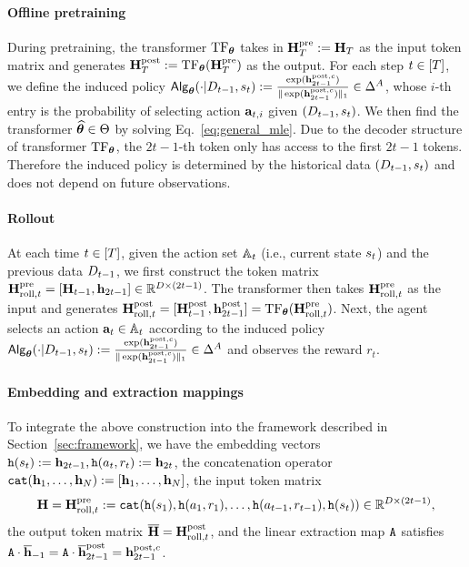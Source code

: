 \paragraph{Offline pretraining} 
During pretraining, the transformer ${\rm TF}_{{\boldsymbol \theta}}$ takes in   ${\mathbf H}_{T}^{\mathrm{pre}}:={\mathbf H}_{T}$ as the input token matrix and generates ${\mathbf H}_{T}^{\mathrm{post}}:={\rm TF}_{{\boldsymbol \theta}}({\mathbf H}_{T}^{\mathrm{pre}})$ as the output. For each step $t\in[{T}]$, we define the  induced policy  ${\mathsf{Alg}}_{{\boldsymbol \theta}}(\cdot|{D}_{t-1},{s}_t):=\frac{\exp({\mathbf h}^{{\mathrm{post}},{c}}_{2t-1})}{\|\exp({\mathbf h}^{{\mathrm{post}},{c}}_{2t-1})\|_1}\in\Delta^A$, whose $i$-th entry is the probability of selecting action ${\mathbf a}_{t,i}$ given $({D}_{t-1},{s}_t)$. We then find the transformer ${\widehat{{\boldsymbol \theta}}}\in{\Theta}$ by solving Eq.~\eqref{eq:general_mle}. 
Due to the decoder structure of transformer ${\rm TF}_{{\boldsymbol \theta}}$, the $2t-1$-th token only has access to the first $2t-1$ tokens. Therefore the induced policy is  determined by the historical data $({D}_{t-1},{s}_t)$ and does not depend on future observations. 
\paragraph{Rollout}
At each time $t\in[{T}]$, given the action set ${\mathbb{A}}_t$ (i.e., current state ${s}_t$) and the previous data ${D}_{t-1}$, we first construct the token matrix ${\mathbf H}^{{\mathrm{pre}}}_{{\mathrm{roll}},t}=[{\mathbf H}_{t-1},{\mathbf h}_{2t-1}]\in\mathbb{R}^{D\times (2t-1)}$.   The transformer then takes ${\mathbf H}^{{\mathrm{pre}}}_{{\mathrm{roll}},t}$ as the input  and generates ${\mathbf H}^{{\mathrm{post}}}_{{\mathrm{roll}},t}=[{\mathbf H}^{{\mathrm{post}}}_{t-1},{\mathbf h}^{{\mathrm{post}}}_{2t-1}]={\rm TF}_{{\boldsymbol \theta}}({\mathbf H}^{{\mathrm{pre}}}_{{\mathrm{roll}},t})$. Next,  the agent selects an action ${\mathbf a}_t\in{\mathbb{A}}_t$ according to the induced  policy ${\mathsf{Alg}}_{{\boldsymbol \theta}}(\cdot|{D}_{t-1},{s}_t):=\frac{\exp({\mathbf h}^{{\mathrm{post}},{c}}_{2t-1})}{\|\exp({\mathbf h}^{{\mathrm{post}},{c}}_{2t-1})\|_1}\in\Delta^A$ and observes the reward $r_t$.

\paragraph{Embedding and extraction mappings}
To integrate the above construction into the  framework described in Section~\ref{sec:framework},  we have the embedding vectors ${\tt h}({s}_t):={\mathbf h}_{2t-1},{\tt h}({a}_t,{r}_t):={\mathbf h}_{2t}$,  the concatenation operator ${\tt cat}({\mathbf h}_1, \ldots, {\mathbf h}_N): = [{\mathbf h}_1, \ldots, {\mathbf h}_N]$, the input token matrix  $${\mathbf H}={\mathbf H}^{\mathrm{pre}}_{{\mathrm{roll}},t}: = {\tt cat}({\tt h}({s}_1), {\tt h}({a}_1, {r}_1), \ldots, {\tt h}({a}_{t-1}, {r}_{t-1}), {\tt h}({s}_t)) \in \mathbb{R}^{D \times (2t-1)},$$ the output token matrix $\overline{{\mathbf H}}={\mathbf H}^{\mathrm{post}}_{{\mathrm{roll}},t}$, and the linear extraction map ${\tt A}$  satisfies ${\tt A}\cdot\overline{{\mathbf h}}_{-1}={\tt A}\cdot\overline{{\mathbf h}}^{\mathrm{post}}_{2t-1}={\mathbf h}^{{\mathrm{post}},{c}}_{2t-1}$. 







